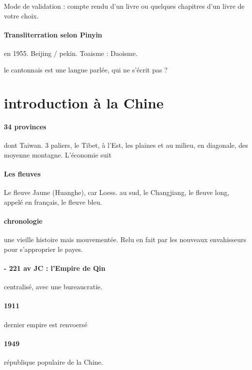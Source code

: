Mode de validation : compte rendu d'un livre ou quelques chapitres d'un livre de votre choix. 

\paragraph{Transliterration selon Pinyin} en 1955. Beijing / pekin. 
Toaisme : Daoisme.

\begin{singlequote}
    le cantonnais est une langue parlée, qui ne s'écrit pas ? 
\end{singlequote}

\section{introduction à la Chine}

\paragraph{34 provinces} dont Taiwan. 3 paliers, le Tibet, à l'Est, les plaines et au milieu, en diagonale, des moyenne montagne. L'économie suit

\paragraph{Les fleuves} Le fleuve Jaune (Huanghe), car Loess. au sud, le Changjiang, le fleuve long, appelé en français, le fleuve bleu.


\paragraph{chronologie} une vieille histoire mais mouvementée. Relu en fait par les nouveaux envahisseurs pour s'approprier le payes. 

\paragraph{- 221 av JC : l'Empire de Qin} centralisé, avec une bureaucratie.

\paragraph{1911} dernier empire est renvoersé
\paragraph{1949} république populaire de la Chine.


